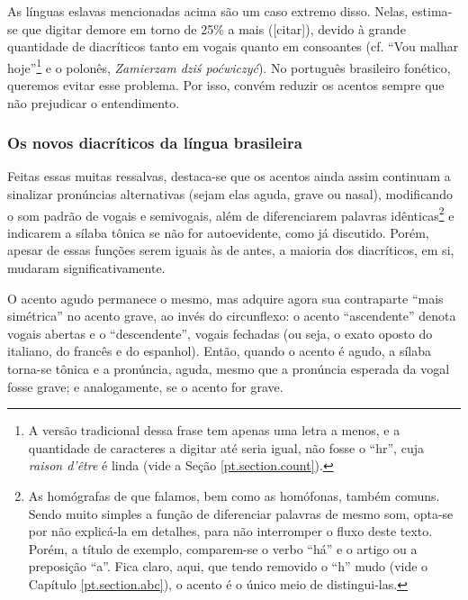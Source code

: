 \documentclass[12pt, a5paper, titlepage]{article}
\begin{document}
As línguas eslavas mencionadas acima são um caso extremo disso. Nelas, estima-se que digitar demore em torno de 25\% a mais ([citar]), devido à grande quantidade de diacríticos tanto em vogais quanto em consoantes (cf. ``Vou malhar hoje''\footnote{
    A versão tradicional dessa frase tem apenas uma letra a menos, e a quantidade de caracteres a digitar até seria igual, não fosse o ``hr'', cuja \textit{raison d'être} é linda (vide a Seção \ref{pt.section.count}).
} e o polonês, \textit{Zamierzam dziś poćwiczyć}). No português brasileiro fonético, queremos evitar esse problema. Por isso, convém reduzir os acentos sempre que não prejudicar o entendimento.

\subsubsection{Os novos diacríticos da língua brasileira}
Feitas essas muitas ressalvas, destaca-se que os acentos ainda assim continuam a sinalizar pronúncias alternativas (sejam elas aguda, grave ou nasal), modificando o som padrão de vogais e semivogais, além de diferenciarem palavras idênticas\footnote{
    As homógrafas de que falamos, bem como as homófonas, também comuns. Sendo muito simples a função de diferenciar palavras de mesmo som, opta-se por não explicá-la em detalhes, para não interromper o fluxo deste texto. Porém, a título de exemplo, comparem-se o verbo ``há'' e o artigo ou a preposição ``a''. Fica claro, aqui, que tendo removido o ``h'' mudo (vide o Capítulo \ref{pt.section.abc}), o acento é o único meio de distingui-las.
} e indicarem a sílaba tônica se não for autoevidente, como já discutido. Porém, apesar de essas funções serem iguais às de antes, a maioria dos diacríticos, em si, mudaram significativamente.

O acento agudo permanece o mesmo, mas adquire agora sua contraparte ``mais simétrica'' no acento grave, ao invés do circunflexo: o acento ``ascendente'' denota vogais abertas e o ``descendente'', vogais fechadas (ou seja, o exato oposto do italiano, do francês e do espanhol). Então, quando o acento é agudo, a sílaba torna-se tônica e a pronúncia, aguda, mesmo que a pronúncia esperada da vogal fosse grave; e analogamente, se o acento for grave.

\PtTableDiacritics
\end{document}
